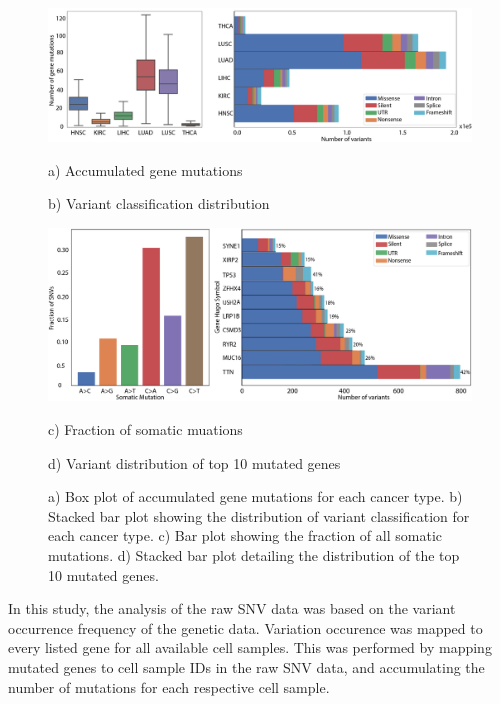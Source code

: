 \begin{figure}[h!]
    \centering
    \includegraphics[width=\textwidth]{img/snvstats.png}
    \noindent
    \begin{minipage}[t]{.39\textwidth}
    \raggedright
        a) Accumulated gene mutations
    \end{minipage}%
    \hspace{1cm}
    \begin{minipage}[t]{.5\textwidth}
        b) Variant classification distribution
    \end{minipage}
    \centering
    \includegraphics[width=\textwidth]{img/snvstats2.png}
    \noindent
    \begin{minipage}[t]{.39\textwidth}
    \raggedright
        c) Fraction of somatic muations
    \end{minipage}%
    \hspace{1cm}
    \begin{minipage}[t]{.5\textwidth}
        d) Variant distribution of top 10 mutated genes
    \end{minipage}
    \caption{a) Box plot of accumulated gene mutations for each cancer type. b) Stacked bar plot showing the distribution of variant classification for each cancer type. c) Bar plot showing the fraction of all somatic mutations. d) Stacked bar plot detailing the distribution of the top 10 mutated genes.}
    \label{fig:snvstats}
\end{figure}

In this study, the analysis of the raw SNV data was based on the variant occurrence frequency of the genetic data. Variation occurence was mapped to every listed gene for all available cell samples. This was performed by mapping mutated genes to cell sample IDs in the raw SNV data, and accumulating the number of mutations for each respective cell sample.

